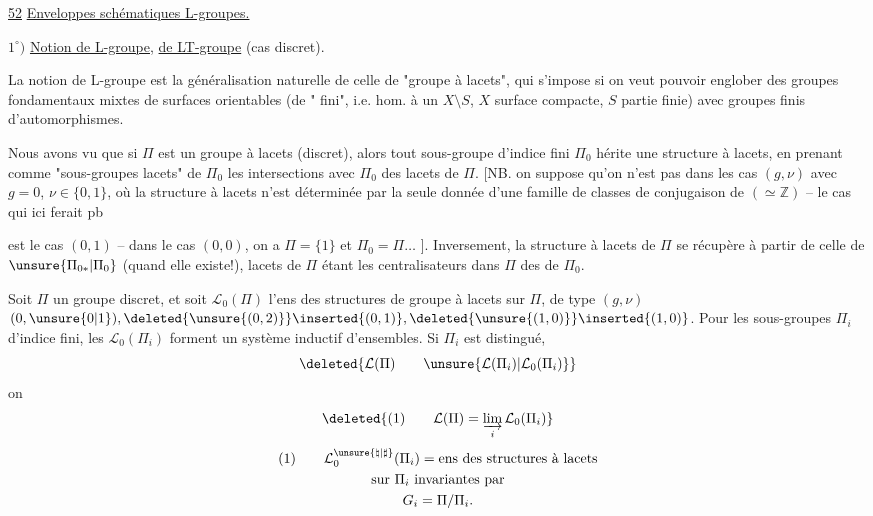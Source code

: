 
\uline{52}\qquad
\uline{Enveloppes schématiques  L-groupes.}

$1^\circ)$ \uline{Notion de L-groupe}, \uline{de LT-groupe} (cas discret).

La notion de L-groupe est la généralisation
naturelle de celle de "groupe à lacets",
qui s'impose si on veut pouvoir englober
des groupes fondamentaux mixtes de
surfaces orientables (de " fini", i.e.
hom. à un $X\setminus S$, $X$ surface compacte,
$S$ partie finie) avec groupes finis d'automorphismes.

Nous avons vu que si $\Pi$ est un
groupe à lacets (discret), alors tout sous-groupe
d'indice fini $\Pi_0$ hérite une
structure à lacets, en prenant comme
"sous-groupes lacets" de $\Pi_0$ les intersections
avec $\Pi_0$ des  lacets de $\Pi$. [NB. on
suppose qu'on n'est pas dans les cas
$(g,\nu)$  avec $g=0$, $\nu\in\{0,1\}$, où la structure à lacets
n'est  déterminée par la seule donnée d'une
famille de classes de conjugaison de 
 $(\simeq\mathbb Z)$ -- le  cas qui ici ferait pb


est le cas $(0,1)$  -- dans le cas $(0,0)$, on a $\Pi=\{1\}$
et $\Pi_0=\Pi\ldots$ ]. Inversement, la structure
à lacets de $\Pi$ se récupère à partir de
celle de $\unsure{\Pi_{0*}|\Pi_0}$ (quand elle existe!), 
 lacets de $\Pi$ étant les centralisateurs
dans $\Pi$ des  de $\Pi_0$.

Soit $\Pi$ un groupe discret,
 et
soit $\mathcal L_0(\Pi)$ l'ens des structures de groupe
à lacets sur $\Pi$, de type $(g,\nu)$
$(0,\unsure{0|1}),
\deleted{\unsure{(0,2)}}\inserted{(0,1)},
\deleted{\unsure{(1,0)}}\inserted{(1,0)}$.
Pour les sous-groupes  $\Pi_i$  d'indice fini,
les $\mathcal L_0(\Pi_i)$ forment un système inductif
d'ensembles.  Si $\Pi_i$ est distingué,
\[
\deleted{\mathcal L(\Pi)\qquad
\unsure{\mathcal L(\Pi_i)|\mathcal L_0(\Pi_i)}}
\]
on  
\[
\deleted{\text{(1)}\qquad
\mathcal L(\Pi)=\varinjlim_i\mathcal L_0(\Pi_i)}
\]
\[
\begin{gathered}
\text{(1)}\qquad
\mathcal L_0^{\unsure{\natural|\sharp}}(\Pi_i)=
\text{ens des structures à lacets}\\
\text{sur }\Pi_i\text{ invariantes par}\\
G_i=\Pi/\Pi_i.
\end{gathered}
\]

